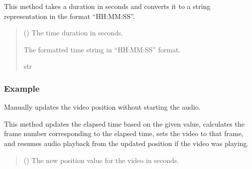 \documentclass[letterpaper,10pt,english]{sphinxmanual}
\begin{document}
\begin{fulllineitems}
\begin{fulllineitems}
\sphinxAtStartPar
This method takes a duration in seconds and converts it to a string representation
in the format “HH:MM:SS”.
\begin{quote}\begin{description}
\sphinxAtStartPar
{} () \textendash{} The time duration in seconds.

\sphinxAtStartPar
The formatted time string in “HH:MM:SS” format.

\sphinxAtStartPar
str

\sphinxAtStartPar
{} \textendash{} 

\end{description}\end{quote}
\subsubsection*{Example}

\begin{sphinxVerbatim}[commandchars=\\\{\}]
  
  
\end{sphinxVerbatim}

\end{fulllineitems}


\begin{fulllineitems}
\label{\detokenize{general_interface:general_interface.LecteurVideo.manual_update_progress}}
\pysigstartsignatures
{}
\pysigstopsignatures
\sphinxAtStartPar
Manually updates the video position without starting the audio.

\sphinxAtStartPar
This method updates the elapsed time based on the given value, calculates the frame number
corresponding to the elapsed time, sets the video to that frame, and resumes audio playback
from the updated position if the video was playing.
\begin{quote}\begin{description}
\sphinxAtStartPar
{} () \textendash{} The new position value for the video in seconds.


\end{description}
\end{quote}
\end{fulllineitems}
\end{fulllineitems}
\end{document}
